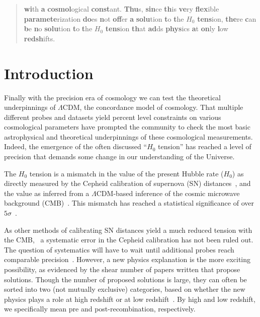 \documentclass[
 reprint,
 amsmath,amssymb,
 aps,
]{revtex4-2}
\begin{document}
\begin{abstract}
\textbf{wi}th \textbf{a} \textbf{cosmol}ogical \textbf{const}ant. \textbf{Thu}s, \textbf{sin}ce \textbf{th}is \textbf{ve}ry \textbf{flex}ible \textbf{paramete}rization \textbf{do}es \textbf{n}ot \textbf{off}er \textbf{a} \textbf{solu}tion \textbf{t}o \textbf{t}he $H_0$ \textbf{tens}ion, \textbf{the}re \textbf{c}an \textbf{b}e \textbf{n}o \textbf{solu}tion \textbf{t}o \textbf{t}he $H_0$ \textbf{tens}ion \textbf{th}at \textbf{ad}ds \textbf{phys}ics \textbf{a}t \textbf{on}ly \textbf{l}ow \textbf{redsh}ifts.\end{abstract}

\maketitle


\section{Introduction}
Finally with the precision era of cosmology we can test the theoretical underpinnings of $\Lambda$CDM, the concordance model of cosmology. That multiple different probes and datasets yield percent level constraints on various cosmological parameters have prompted the community to check the most basic astrophysical and theoretical underpinnings of these cosmological measurements.  Indeed, the emergence of the often discussed ``$H_0$ tension'' has reached a level of precision that demands some change in our understanding of the Universe. 

The $H_0$ tension is a mismatch in the value of the present Hubble rate ($H_0$) as directly measured by the Cepheid calibration of supernova (SN) distances~\cite{Riess:2016jrr,Riess:2019cxk,Riess:2020fzl}, and the value as inferred from a $\Lambda$CDM-based inference of the cosmic microwave background (CMB)~\cite{Planck:2018vyg}.  This mismatch has reached a statistical significance of over $5\sigma$~\cite{Riess:2021jrx}.  

As other methods of calibrating SN distances yield a much reduced tension with the CMB,~\cite{Freedman:2019jwv} a systematic error in the Cepheid calibration has not been ruled out. The question of systematics will have to wait until additional probes reach comparable precision~\cite{Birrer:2020tax,LIGOScientific:2017adf,LIGOScientific:2019zcs}. However, a new physics explanation is the more exciting possibility, as evidenced by the shear number of papers written that propose solutions. Though the number of proposed solutions is large, they can often be sorted into two (not mutually exclusive) categories, based on whether the new physics plays a role at high redshift or at low redshift~\cite{Linder:2021ujs,Abdalla:2022yfr}. By high and low redshift, we specifically mean pre and post-recombination, respectively.
\end{document}
